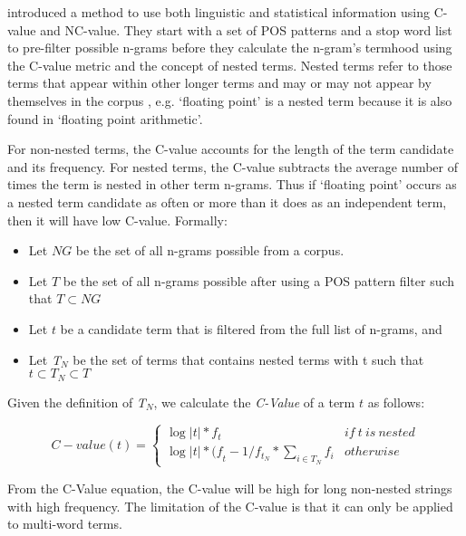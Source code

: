 \cite{frantzi1998c,frantzi2000automatic} introduced a method to use both linguistic and statistical information using C-value and NC-value. They start with a set of POS patterns and a stop word list to pre-filter possible n-grams before they calculate the n-gram’s termhood using the C-value metric and the concept of nested terms. Nested terms refer to those terms that appear within other longer terms and may or may not appear by themselves in the corpus \citep{frantzi1998c}, e.g. ‘floating point’ is a nested term because it is also found in ‘floating point arithmetic’.

For non-nested terms, the C-value accounts for the length of the term candidate and its frequency. For nested terms, the C-value subtracts the average number of times the term is nested in other term n-grams. Thus if ‘floating point’ occurs as a nested term candidate as often or more than it does as an independent term, then it will have low C-value.  Formally:

\begin{itemize}[noitemsep]
\item[] Let $NG$ be the set of all n-grams possible from a corpus.
\item[] Let $T$ be the set of all n-grams possible after using a POS pattern filter such that $T\subset NG$
\item[] Let $t$ be a candidate term that is filtered from the full list of n-grams, and
\item[] Let \emph{T$_N$} be the set of terms that contains nested terms with t such that $t\subset T_N \subset T$
\end{itemize}

Given the definition of \emph{T$_N$}, we calculate the \emph{C-Value} of a term $t$ as follows:

\begin{equation}
C-value(t)=
	\left \{
		\begin{matrix} 
		\log { |t| } *{ f }_{ t }  & if \ t \ is \ nested\\
		\log { |t| } *{ (f }_{ t }-{ 1 }/{ { f }_{ { t }_{ N } } }*
			\sum _{ i\in { T }_{ N } }^{  }{ { f }_{ i } }  & otherwise
		\end{matrix} 
	\right .
\end{equation}

From the C-Value equation, the C-value will be high for long non-nested strings with high frequency. The limitation of the C-value is that it can only be applied to multi-word terms.

